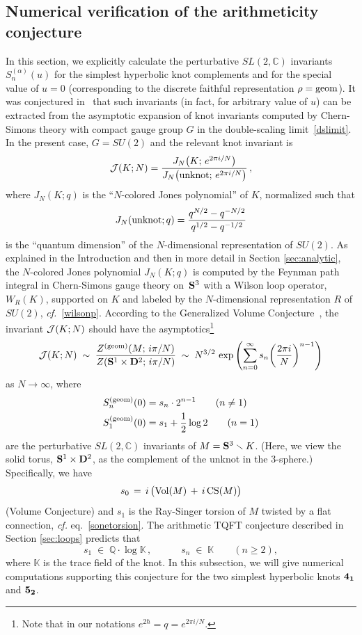 \documentclass[hyper]{JHEP3}
\def\CJ {{\cal J}}
\newcommand{\C}{{\mathbb{C}}}
\newcommand\be{\begin{equation}}
\newcommand\ee{\end{equation}}
\def\sm{\smallsetminus}
\begin{document}

\subsection{Numerical verification of the arithmeticity conjecture}
\label{sec:arith_example}

In this section, we explicitly calculate the perturbative $SL(2,\C)$ invariants
$S_n^{(\alpha)} (u)$ for the simplest hyperbolic knot complements and
for the special value of $u=0$ (corresponding to the discrete faithful representation $\rho = {\rm geom}$).
It was conjectured in~\cite{gukov-2003} that such invariants (in fact, for arbitrary value of $u$)
can be extracted from the asymptotic expansion of knot invariants computed by Chern-Simons theory
with compact gauge group $G$ in the double-scaling limit~\eqref{dslimit}.
In the present case, $G=SU(2)$ and the relevant knot invariant is
\be \CJ(K;N) =  \frac{J_N\bigl(K;\,e^{2\pi i/N}\bigr)}{J_N\bigl({\rm unknot};\,e^{2\pi i/N}\bigr)}\,, \ee
where $J_N(K;q)$ is the ``$N$-colored Jones polynomial'' of $K$,
normalized such that
\be
J_N ({\rm unknot};q) = \frac{q^{N/2}-q^{-N/2}}{q^{1/2}-q^{-1/2}}
\ee
is the ``quantum dimension'' of the $N$-dimensional representation of $SU(2)$.
As explained in the Introduction and then in more detail in Section \ref{sec:analytic},
the $N$-colored Jones polynomial $J_N(K;q)$ is computed by the Feynman path integral
in Chern-Simons gauge theory on~${\bf S}^3$ with a Wilson loop operator, $W_R (K)$,
supported on $K$ and labeled by the $N$-dimensional representation $R$ of $SU(2)$, {\it cf.}~\eqref{wilsonp}.
According to the Generalized Volume Conjecture~\cite{gukov-2003},
the invariant $\CJ(K;N)$ should have the asymptotics\footnote{Note that in our notations $e^{2\hbar}=q=e^{2\pi i/N}$.}
  \be\label{JKn} \CJ(K;N) \;\sim\; \frac{ Z^{\text{(geom)}}(M;\,i\pi/N)}
  {Z({\bf S}^1 \times {\bf D}^2;\,i\pi/N)}\;\sim\;N^{3/2}\, \exp\left( \sum_{n=0}^\infty s_n \biggl(\frac{2\pi i}N\biggr)^{n-1} \right)
  \ee
as $N\to\infty$, where
\begin{align}
S_n^{(\rm geom)}(0) & = s_n \cdot 2^{n-1} \qquad(n \ne 1) \label{Ss} \\
S_1^{(\rm geom)}(0) & = s_1 + \frac{1}{2} \log 2 \qquad(n=1) \nonumber
\end{align}
are the perturbative $SL(2,\C)$ invariants of $M = {\bf S}^3 \sm K$.
(Here, we view the solid torus, ${\bf S}^1 \times {\bf D}^2$, as the complement
of the unknot in the 3-sphere.) Specifically, we have
\be\label{VolConj} s_0\,=\,i\,\bigl(\text{Vol}(M)\,+\,i\,{\rm CS}(M)\bigr)\ee
(Volume Conjecture) and $s_1$ is the Ray-Singer torsion of $M$ twisted by a flat connection, {\it cf.} eq.~\eqref{sonetorsion}.
The arithmetic TQFT conjecture described in Section \ref{sec:loops} predicts that
\be\label{ArithConj} s_1\;\in\;\mathbb Q\cdot\log\mathbb K\,,\quad\qquad s_n\;\in\;\mathbb K\qquad(n\ge2),\ee
where $\mathbb K$ is the trace field of the knot. In this subsection, we will give numerical
computations supporting this conjecture for the two simplest hyperbolic knots ${\bf 4_1}$ and ${\bf 5_2}$.
\end{document}
